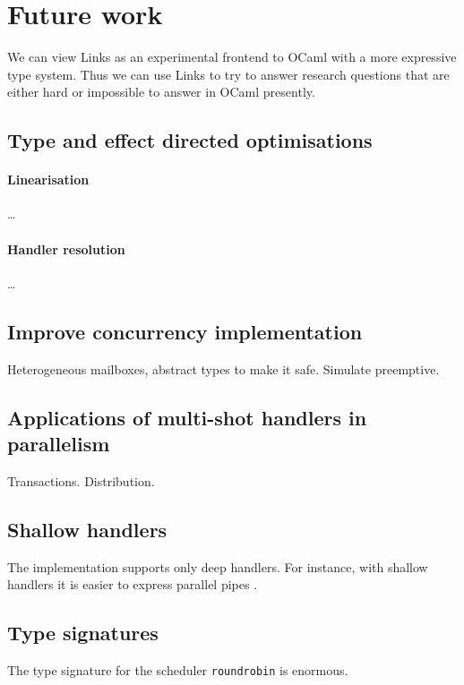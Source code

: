 \documentclass[12pt,mscres,cdtppar,twoside,openright,logo,rightchapter,normalheadings]{infthesis}
\theoremstyle{definition}
\begin{document}
\section{Future work}
\label{sec:futurework}

We can view Links as an experimental frontend to OCaml with a more
expressive type system. Thus we can use Links to try to answer
research questions that are either hard or impossible to answer in
OCaml presently.

\subsection{Type and effect directed optimisations}
\paragraph{Linearisation} \dots

\paragraph{Handler resolution} \dots

\subsection{Improve concurrency implementation}
Heterogeneous mailboxes, abstract types to make it safe. Simulate
preemptive.

\subsection{Applications of multi-shot handlers in parallelism}
Transactions. Distribution.

\subsection{Shallow handlers}
The implementation supports only deep handlers. For instance, with
shallow handlers it is easier to express parallel pipes
\citep{Kammar2013}.

\subsection{Type signatures}
The type signature for the scheduler \lstinline$roundrobin$ is
enormous.



%

\singlespace



\end{document}
